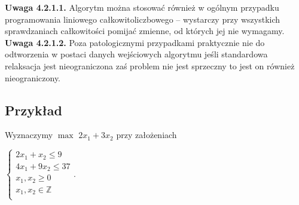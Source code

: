 \documentclass[licencjacka]{pracamgr}
\begin{document}
%
\textbf{Uwaga 4.2.1.1.} Algorytm można stosować również w ogólnym przypadku programowania liniowego całkowitoliczbowego --
wystarczy przy wszystkich sprawdzaniach całkowitości pomijać zmienne, od których jej nie wymagamy.\newline\newline
%
\textbf{Uwaga 4.2.1.2.} Poza patologicznymi przypadkami praktycznie nie do odtworzenia w postaci danych wejściowych algorytmu
jeśli standardowa relaksacja jest nieograniczona zaś problem nie jest sprzeczny to jest on również nieograniczony.\newline
%
    \subsection{Przykład}
Wyznaczymy\newline
$
\max$ $2x_1+3x_2$ przy założeniach
\begin{center}
$\left\{\begin{array}{c}
2x_1+x_2\le 9\\
4x_1+9x_2\le37\\
x_1,x_2\ge0\\
x_1,x_2\in\mathbb{Z}\\
\end{array}\right.
$.\end{center}
\end{document}
